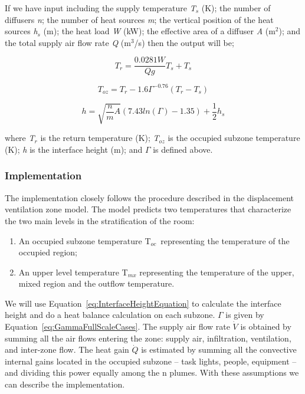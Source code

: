 If we have input including the supply temperature \emph{T\(_{s}\)} (K); the number of diffusers \emph{n}; the number of heat sources \emph{m}; the vertical position of the heat sources \emph{h\(_{s}\)} (m); the heat load \emph{W} (kW); the effective area of a diffuser \emph{A} (m\(^{2}\)); and the total supply air flow rate \emph{Q} (m\(^{3}\)/s) then the output will be;

\begin{equation}
{T_r} = \frac{{0.0281W}}{{Qg}}{T_s} + {T_s}
\end{equation}

\begin{equation}
{T_{oz}} = {T_r} - 1.6{\Gamma ^{ - 0.76}}({T_r} - {T_s})
\end{equation}

\begin{equation}
h = \sqrt {\frac{n}{m}A} (7.43ln(\Gamma ) - 1.35) + \frac{1}{2}{h_s}
\label{eq:InterfaceHeightEquation}
\end{equation}

where \emph{T\(_{r}\)} is the return temperature (K); \emph{T\(_{oz}\)} is the occupied subzone temperature (K); \emph{h} is the interface height (m); and \emph{\(\Gamma\)} is defined above.

\subsubsection{Implementation}\label{implementation-1}

The implementation closely follows the procedure described in the displacement ventilation zone model. The model predicts two temperatures that characterize the two main levels in the stratification of the room:

\begin{enumerate}
\item An occupied subzone temperature T\(_{oc}\)~representing the temperature of the occupied region;
\item An upper level temperature T\(_{mx}\) representing the temperature of the upper, mixed region and the outflow temperature.
\end{enumerate}

We will use Equation~\ref{eq:InterfaceHeightEquation} to calculate the interface height and do a heat balance calculation on each subzone. \emph{\(\Gamma\)} is given by Equation~\ref{eq:GammaFullScaleCases}. The supply air flow rate \(\dot V\) is obtained by summing all the air flows entering the zone: supply air, infiltration, ventilation, and inter-zone flow. The heat gain \(\dot Q\) is estimated by summing all the convective internal gains located in the occupied subzone -- task lights, people, equipment -- and dividing this power equally among the n plumes. With these assumptions we can describe the implementation.

